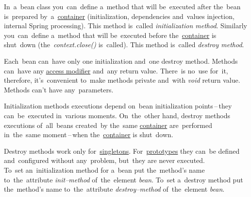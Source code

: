 In~a~bean class you~can~define a~method that will be~executed after the~bean is~prepared by~a~\hyperref[springcontainrer]{container} (initialization, dependencies and~values injection, internal Spring processing). This method is~called \textit{initialization method}. Similarly you~can~define a~method that will be~executed before the~\hyperref[springcontainrer]{container} is shut~down (the~\textit{context.close()} is~called). This method is~called \textit{destroy method}.

Each~bean can~have only one initialization and~one destroy method. Methods can~have any \hyperref[accessmodifiers]{access modifier} and~any return value. There~is no~use for~it, therefore, it's~convenient to~make methods private and~with \textit{void} return value. Methods can't have any~parameters.

Initialization methods executions depend on~bean initialization points\,--\,they can~be~executed in~various moments. On~the~other hand, destroy methods executions of~all~beans created~by the~same \hyperref[springcontainrer]{container} are~performed in~the~same moment\,--\,when the~\hyperref[springcontainrer]{container} is shut~down.

\warning Destroy methods work only for~\hyperref[singletondp]{singletons}. For~\hyperref[prototypedp]{prototypes} they can~be defined and~configured without any~problem, but~they are never executed.\\

\noindent To~set an~initialization method for a~bean put the~method's name to~the~attribute \textit{init--method} of~the~element \textit{bean}. To~set a~destroy method put the~method's name to~the~attribute \textit{destroy--method} of~the~element \textit{bean}.
\newpage


